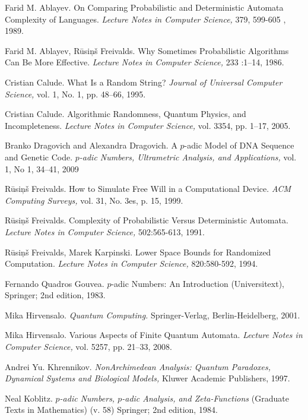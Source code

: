 \documentclass{llncs}
\begin{document}
\begin{thebibliography}{99}


Farid M. Ablayev. 
On Comparing Probabilistic and Deterministic Automata Complexity of Languages. 
{\em Lecture Notes in Computer Science,} 379, 599-605  , 1989.

Farid M. Ablayev, R\= usi\c n\v s Freivalds. 
Why Sometimes Probabilistic Algorithms Can Be More Effective. 
{\em Lecture Notes in Computer Science,} 233 :1--14, 1986.


Cristian Calude.
What Is a Random String?
{\em Journal of Universal Computer Science,} vol. 1, No. 1, pp. 48--66, 1995.

Cristian Calude.
Algorithmic Randomness, Quantum Physics, and Incompleteness.
{\em Lecture Notes in Computer Science,} vol. 3354, pp. 1--17, 2005.


Branko Dragovich and Alexandra Dragovich.
A $p$-adic Model
of DNA Sequence and Genetic Code.
{\em $p$-adic Numbers, Ultrametric Analysis, and Applications,}
vol. 1, No 1, 34--41, 2009

R\= usi\c n\v s Freivalds.
How to Simulate Free Will in a Computational Device. 
{\em ACM Computing Surveys,} vol. 31, No. 3es, p. 15, 1999.


R\= usi\c n\v s Freivalds.
Complexity of Probabilistic Versus Deterministic Automata. 
{\em Lecture Notes in Computer Science,} 502:565-613, 1991. 

R\= usi\c n\v s Freivalds, Marek Karpinski. 
Lower Space Bounds for Randomized Computation. 
{\em Lecture Notes in Computer Science,} 820:580-592, 1994. 




Fernando Quadros Gouvea.
$p$-adic Numbers: An Introduction (Universitext),
Springer; 2nd edition, 1983.


Mika Hirvensalo.
{\em Quantum Computing.} Springer-Verlag, Berlin-Heidelberg,  2001.

Mika Hirvensalo.
Various Aspects of Finite Quantum Automata. 
{\em Lecture Notes in Computer Science,} vol. 5257, pp. 21--33, 2008. 


Andrei Yu. Khrennikov.
{\em NonArchimedean Analysis: Quantum Paradoxes, Dynamical Systems and
Biological Models,} Kluwer Academic Publishers, 1997.

Neal Koblitz.
{\em $p$-adic Numbers, $p$-adic Analysis, and Zeta-Functions} (Graduate Texts in Mathematics) (v. 58)
Springer; 2nd edition, 1984.


\end{thebibliography}
\end{document}
